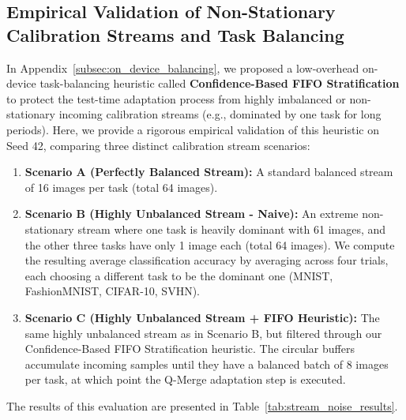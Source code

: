 \subsection{Empirical Validation of Non-Stationary Calibration Streams and Task Balancing}
\label{subsec:stream_noise_results}
In Appendix~\ref{subsec:on_device_balancing}, we proposed a low-overhead on-device task-balancing heuristic called \textbf{Confidence-Based FIFO Stratification} to protect the test-time adaptation process from highly imbalanced or non-stationary incoming calibration streams (e.g., dominated by one task for long periods). Here, we provide a rigorous empirical validation of this heuristic on Seed 42, comparing three distinct calibration stream scenarios:
\begin{enumerate}
    \item \textbf{Scenario A (Perfectly Balanced Stream):} A standard balanced stream of 16 images per task (total 64 images).
    \item \textbf{Scenario B (Highly Unbalanced Stream - Naive):} An extreme non-stationary stream where one task is heavily dominant with 61 images, and the other three tasks have only 1 image each (total 64 images). We compute the resulting average classification accuracy by averaging across four trials, each choosing a different task to be the dominant one (MNIST, FashionMNIST, CIFAR-10, SVHN).
    \item \textbf{Scenario C (Highly Unbalanced Stream + FIFO Heuristic):} The same highly unbalanced stream as in Scenario B, but filtered through our Confidence-Based FIFO Stratification heuristic. The circular buffers accumulate incoming samples until they have a balanced batch of 8 images per task, at which point the Q-Merge adaptation step is executed.
\end{enumerate}

The results of this evaluation are presented in Table~\ref{tab:stream_noise_results}.

